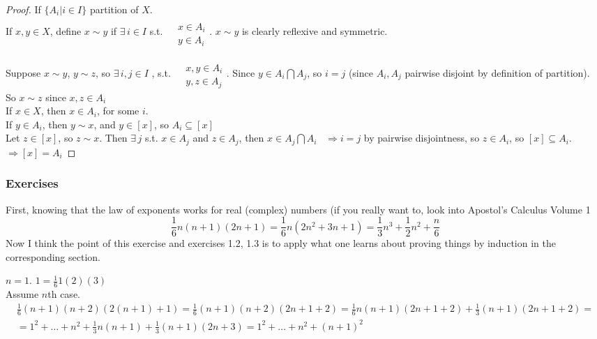 \documentclass[twoside,landscape]{amsart}
\theoremstyle{plain}
\theoremstyle{definition}
\theoremstyle{remark}
\newcommand{\exercisehead}[1]
  { \smallskip
   \noindent{\small\bf Exercise #1.}
  }
\begin{document}
\begin{multicols*}{2}
\begin{proof}
If $\lbrace A_i | i \in I \rbrace$ partition of $X$.   \\
If $x,y \in X$, define $x\sim y$ if $\exists \, i \in I$ s.t. $\begin{aligned} &  \quad \\
  & x \in A_i \\
  & y \in A_i \end{aligned}$.  $x\sim y$ is clearly reflexive and symmetric.  

Suppose $x\sim y$, $y\sim z$, so $\exists \, i,j \in I$ , s.t. $\begin{aligned} & \quad \\
  & x,y \in A_i \\
  & y,z \in A_j \end{aligned}$.  Since $y \in A_i \bigcap A_j$, so $i=j$ (since $A_i,A_j$ pairwise disjoint by definition of partition).  \\
So $x\sim z$ since $x,z \in A_i$ \\
If $x\in X$, then $x\in A_i$, for some $i$.  \\
If $y \in A_i$, then $y\sim x$, and $y\in [x]$, so $A_i \subseteq [x]$ \\
Let $z\in [x]$, so $z\sim x$.  Then $\exists \, j$ s.t. $x\in A_j$ and $z\in A_j$, then $x\in A_j \bigcap A_i$ \, $\Longrightarrow i=j$ by pairwise disjointness, so $z \in A_i$, so $[x] \subseteq A_i$.  $\Longrightarrow [x] = A_i$
\end{proof}




\subsubsection*{Exercises}

\exercisehead{1.1} 
First, knowing that the law of exponents works for real (complex) numbers (if you really want to, look into Apostol's Calculus Volume 1
\[
\frac{1}{6} n(n+1)(2n+1) = \frac{1}{6}n(2n^2 + 3n+1) = \frac{1}{3}n^3 + \frac{1}{2} n^2 + \frac{n}{6}
\]
Now I think the point of this exercise and exercises 1.2, 1.3 is to apply what one learns about proving things by induction in the corresponding section.

$n=1$.  $1 = \frac{1}{6}1(2)(3)$ \\
Assume $n$th case.  
\[
\begin{gathered}
  \frac{1}{6}(n+1)(n+2)(2(n+1) + 1) = \frac{1}{6}(n+1)(n+2)(2n+1 +2) = \frac{1}{6}n(n+1)(2n+1+2) + \frac{1}{3}(n+1)(2n+1+2) = \\
  = 1^2 + \dots + n^2 + \frac{1}{3}n(n+1) + \frac{1}{3}(n+1)(2n+3) = 1^2 + \dots + n^2 + (n+1)^2
\end{gathered}
\]


\end{multicols*}
\end{document}
